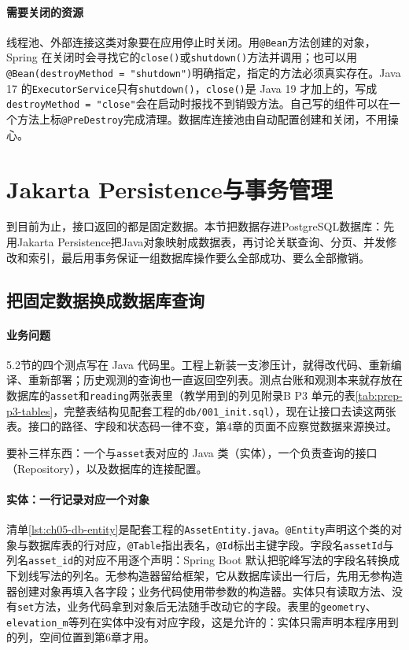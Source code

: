 \paragraph{需要关闭的资源}线程池、外部连接这类对象要在应用停止时关闭。用\texttt{@Bean}方法创建的对象，Spring 在关闭时会寻找它的\texttt{close()}或\texttt{shutdown()}方法并调用；也可以用\texttt{@Bean(destroyMethod = "shutdown")}明确指定，指定的方法必须真实存在。Java 17 的\texttt{ExecutorService}只有\texttt{shutdown()}，\texttt{close()}是 Java 19 才加上的，写成\texttt{destroyMethod = "close"}会在启动时报找不到销毁方法。自己写的组件可以在一个方法上标\texttt{@PreDestroy}完成清理。数据库连接池由自动配置创建和关闭，不用操心。

\section{Jakarta Persistence与事务管理}

到目前为止，接口返回的都是固定数据。本节把数据存进PostgreSQL数据库：先用Jakarta Persistence把Java对象映射成数据表，再讨论关联查询、分页、并发修改和索引，最后用事务保证一组数据库操作要么全部成功、要么全部撤销。

\subsection{把固定数据换成数据库查询}\label{sec:ch05-db-step}

\paragraph{业务问题}5.2节的四个测点写在 Java 代码里。工程上新装一支渗压计，就得改代码、重新编译、重新部署；历史观测的查询也一直返回空列表。测点台账和观测本来就存放在数据库的\texttt{asset}和\texttt{reading}两张表里（教学用到的列见附录B P3 单元的表\ref{tab:prep-p3-tables}，完整表结构见配套工程的\texttt{db/001\_init.sql}），现在让接口去读这两张表。接口的路径、字段和状态码一律不变，第4章的页面不应察觉数据来源换过。

要补三样东西：一个与\texttt{asset}表对应的 Java 类（实体），一个负责查询的接口（Repository），以及数据库的连接配置。

\paragraph{实体：一行记录对应一个对象}清单\ref{lst:ch05-db-entity}是配套工程的\texttt{AssetEntity.java}。\texttt{@Entity}声明这个类的对象与数据库表的行对应，\texttt{@Table}指出表名，\texttt{@Id}标出主键字段。字段名\texttt{assetId}与列名\texttt{asset\_id}的对应不用逐个声明：Spring Boot 默认把驼峰写法的字段名转换成下划线写法的列名。无参构造器留给框架，它从数据库读出一行后，先用无参构造器创建对象再填入各字段；业务代码使用带参数的构造器。实体只有读取方法、没有\texttt{set}方法，业务代码拿到对象后无法随手改动它的字段。表里的\texttt{geometry}、\texttt{elevation\_m}等列在实体中没有对应字段，这是允许的：实体只需声明本程序用到的列，空间位置到第6章才用。

